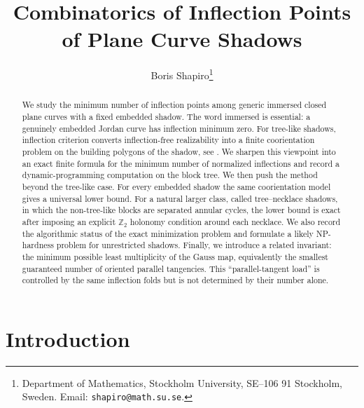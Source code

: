 \documentclass[11pt]{article}
\title{Combinatorics of Inflection Points of Plane Curve Shadows}
\author{Boris Shapiro\thanks{Department of Mathematics, Stockholm University,
SE--106 91 Stockholm, Sweden. Email: \texttt{shapiro@math.su.se}.}}
\date{}
\begin{document}
\maketitle

\begin{abstract}
We study the minimum number of inflection points among generic immersed closed plane curves with a fixed embedded shadow.  The word immersed is essential: a genuinely embedded Jordan curve has inflection minimum zero.  For tree-like shadows, inflection criterion converts inflection-free realizability into a finite coorientation problem on the building polygons of the shadow, see \cite{ShapiroTree}.  We sharpen this viewpoint into an exact finite formula for the minimum number of normalized inflections and record a dynamic-programming computation on the block tree.  We then push the method beyond the tree-like case.  For every embedded shadow the same coorientation model gives a universal lower bound.  For a natural larger class, called tree--necklace shadows, in which the non-tree-like blocks are separated annular cycles, the lower bound is exact after imposing an explicit $\mathbb Z_2$ holonomy condition around each necklace.  We also record the algorithmic status of the exact minimization problem and formulate a likely NP-hardness problem for unrestricted shadows.  Finally, we introduce a related invariant: the minimum possible least multiplicity of the Gauss map, equivalently the smallest guaranteed number of oriented parallel tangencies.  This ``parallel-tangent load'' is controlled by the same inflection folds but is not determined by their number alone.
\end{abstract}

\makeatletter
\insert{}
\makeatother

\section{Introduction}
\end{document}
